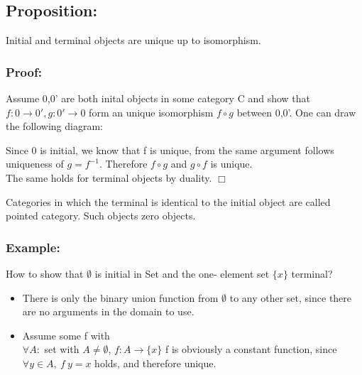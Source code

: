 \subsection {Proposition:}
   Initial and terminal objects are unique up to isomorphism.

\subsubsection {Proof:}
   Assume 0,0' are both inital objects in some category C and show that $f: 0 \to 0', g: 0' \to 0$ form an unique isomorphism $f \circ g$ between 0,0'. One can draw the following diagram:
  
 

  Since 0 is initial, we know that f is unique, from the same argument follows uniqueness of $g = f^{-1}$. Therefore $f \circ g$ and $g \circ f$ is unique.    
    \\ The same holds for terminal objects by duality. $\Box$

        Categories in which the terminal is identical to the initial object are called pointed category. Such objects zero objects.

    \subsubsection {Example:}
    How to show that $\emptyset$ is initial in Set and the one- element set $\{x\}$ terminal?

    \begin {itemize}
    \item There is only the binary union function from $\emptyset$ to any other set, since there are no arguments in the domain to use.
    \item Assume some f with
      \\ $\forall A:$ set with $A \neq \emptyset$, $ f: A \to \{x\}$
      f is obviously a constant function, since $\forall y \in A,\ f \ y = x$ holds, and therefore unique.
		\end{itemize}


